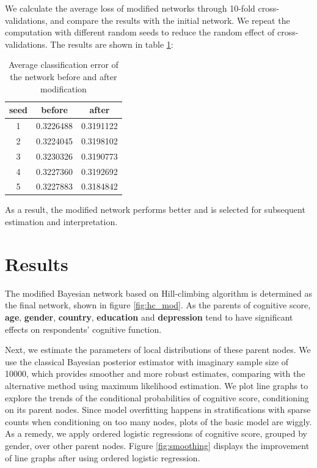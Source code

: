 \documentclass[11pt,twoside]{article}
\numberwithin{Theorem}{section}
\numberwithin{Definition}{section}
\numberwithin{Lemma}{section}
\numberwithin{Algorithm}{section}
\numberwithin{equation}{section}
\begin{document}
We calculate the average loss of modified networks through 10-fold cross-validations, and compare the results with the initial network. We repeat the computation with different random seeds to reduce the random effect of cross-validations. The results are shown in table \ref{tab:hc}:

\begin{table}[!h]
	\centering
	\begin{tabular}{|c|c|c|}
		\hline
		seed & before & after \\
		\hline
		1 & 0.3226488 & 0.3191122 \\
		2 & 0.3224045 & 0.3198102 \\
		3 & 0.3230326 & 0.3190773 \\
		4 & 0.3227360 & 0.3192692 \\
		5 & 0.3227883 & 0.3184842 \\
		\hline
	\end{tabular}
	\caption{Average classification error of the network before and after modification}
	\label{tab:hc}
\end{table}

As a result, the modified network performs better and is selected for subsequent estimation and interpretation.

\clearpage

\section{Results}
\label{sec:results}

The modified Bayesian network based on Hill-climbing algorithm is determined as the final network, shown in figure \ref{fig:hc_mod}.  As the parents of cognitive score, \textbf{age}, \textbf{gender}, \textbf{country}, \textbf{education} and \textbf{depression} tend to have significant effects on respondents' cognitive function. 

Next, we estimate the parameters of local distributions of these parent nodes. We use the classical Bayesian posterior estimator with imaginary sample size of 10000, which provides smoother and more robust estimates, comparing with the alternative method using maximum likelihood estimation. We plot line graphs to explore the trends of the conditional probabilities of cognitive score, conditioning on its parent nodes. Since model overfitting happens in stratifications with sparse counts when conditioning on too many nodes, plots of the basic model are wiggly. As a remedy, we apply ordered logistic regressions of cognitive score, grouped by gender, over other parent nodes. Figure \ref{fig:smoothing} displays the improvement of line graphs after using ordered logistic regression.
\end{document}
